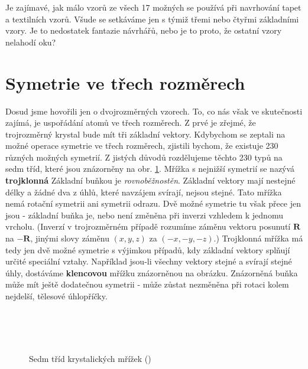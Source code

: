     Je zajímavé, jak málo vzorů ze všech \num{17} možných se používá při navrhování tapet a 
    textilních vzorů. Všude se setkáváme jen s týmiž třemi nebo čtyřmi základními vzory. Je to 
    nedostatek fantazie návrhářů, nebo je to proto, že ostatní vzory nelahodí oku?
    
  \section{Symetrie ve třech rozměrech}\label{fyz:IIchapXXXsecVI}
    Dosud jsme hovořili jen o dvojrozměrných vzorech. To, co nás však ve skutečnosti zajímá, je 
    uspořádání atomů ve třech rozměrech. Z prvé je zřejmé, že trojrozměrný krystal bude mít tři 
    základní vektory. Kdybychom se zeptali na možné operace symetrie ve třech rozměrech, zjistili 
    bychom, že existuje \num{230} různých možných symetrií. Z jistých důvodů rozdělujeme těchto 
    \num{230} typů na sedm tříd, které jsou znázorněny na obr. \ref{fyz:fig0744}. Mřížka s nejnižší 
    symetrií se nazývá \textbf{trojklonná} Základní buňkou je \emph{rovnoběžnostěn}. Základní 
    vektory mají nestejné délky a žádné dva z úhlů, které navzájem svírají, nejsou stejné. Tato 
    mřížka nemá rotační symetrii ani symetrii odrazu. Dvě možné symetrie tu však přece jen jsou - 
    základní buňka je, nebo není změněna při inverzi vzhledem k jednomu vrcholu. (Inverzí v 
    trojrozměrném případě rozumíme záměnu vektoru posunutí \(\bm{R}\) na \(\bm{-R}\), jinými slovy 
    záměnu \((x, y, z)\) za \((-x, -y, -z)\).) Trojklonná mřížka má tedy jen dvě možné symetrie s 
    výjimkou případů, kdy základní vektory splňují určité speciální vztahy. Například jsou-li 
    všechny vektory stejné a svírají stejné úhly, dostáváme \textbf{klencovou} mřížku znázorněnou 
    na obrázku. Znázorněná buňka může mít ještě dodatečnou symetrii - může zůstat nezměněna při 
    rotaci kolem nejdelší, tělesové úhlopříčky.
    

    \begin{figure}[ht!]   %
      \centering
                    \\
                    \\
                    \\
      \caption{Sedm tříd krystalických mřížek (\cite[s.~552]{Feynman02})}
      \label{fyz:fig0744}
    \end{figure}
    
